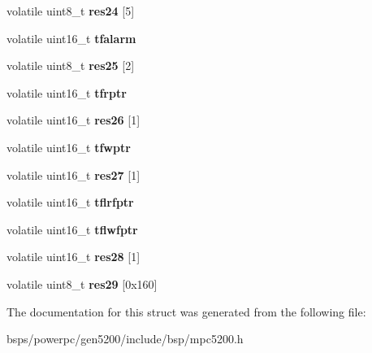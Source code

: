 \begin{DoxyCompactItemize}
\item 
\mbox{\label{structmpc5200___1_1mpc5200__psc_a9541002ccc0a58a16e7b164697972f23}} 
volatile uint8\+\_\+t {\bfseries res24} \mbox{[}5\mbox{]}
\item 
\mbox{\label{structmpc5200___1_1mpc5200__psc_ac7124c0887429242ed232d5ed2b97226}} 
volatile uint16\+\_\+t {\bfseries tfalarm}
\item 
\mbox{\label{structmpc5200___1_1mpc5200__psc_a6d10ab30889c02f0016aec5e60f13bba}} 
volatile uint8\+\_\+t {\bfseries res25} \mbox{[}2\mbox{]}
\item 
\mbox{\label{structmpc5200___1_1mpc5200__psc_a91184dfd15375eb9e424b2bba913b725}} 
volatile uint16\+\_\+t {\bfseries tfrptr}
\item 
\mbox{\label{structmpc5200___1_1mpc5200__psc_a015869d12122810f9f703acef7803415}} 
volatile uint16\+\_\+t {\bfseries res26} \mbox{[}1\mbox{]}
\item 
\mbox{\label{structmpc5200___1_1mpc5200__psc_aa79dcbfc2aa9b9e47a9f3ff75f15acb3}} 
volatile uint16\+\_\+t {\bfseries tfwptr}
\item 
\mbox{\label{structmpc5200___1_1mpc5200__psc_a78800b8a644c20e064f4542c8da29ef6}} 
volatile uint16\+\_\+t {\bfseries res27} \mbox{[}1\mbox{]}
\item 
\mbox{\label{structmpc5200___1_1mpc5200__psc_a56b0ed544d85e8f33370413efe7d28df}} 
volatile uint16\+\_\+t {\bfseries tflrfptr}
\item 
\mbox{\label{structmpc5200___1_1mpc5200__psc_a5759aaf731f55754642b58fc1f356eb2}} 
volatile uint16\+\_\+t {\bfseries tflwfptr}
\item 
\mbox{\label{structmpc5200___1_1mpc5200__psc_ac4903088e79efaa6b1240fd33b60bd36}} 
volatile uint16\+\_\+t {\bfseries res28} \mbox{[}1\mbox{]}
\item 
\mbox{\label{structmpc5200___1_1mpc5200__psc_aafc0de78c9e61f1c4a6abd9d44813cbc}} 
volatile uint8\+\_\+t {\bfseries res29} \mbox{[}0x160\mbox{]}
\end{DoxyCompactItemize}


The documentation for this struct was generated from the following file\+:\begin{DoxyCompactItemize}
\item 
bsps/powerpc/gen5200/include/bsp/mpc5200.\+h\end{DoxyCompactItemize}
